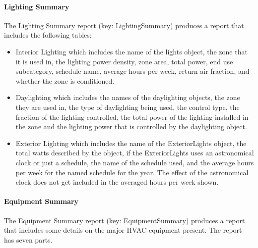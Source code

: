 \paragraph{Lighting Summary}\label{lighting-summary}

The Lighting Summary report (key: LightingSummary) produces a report that includes the following tables:

\begin{itemize}
\item
  Interior Lighting which includes the name of the lights object, the zone that it is used in, the lighting power density, zone area, total power, end use subcategory, schedule name, average hours per week, return air fraction, and whether the zone is conditioned.
\item
  Daylighting which includes the names of the daylighting objects, the zone they are used in, the type of daylighting being used, the control type, the fraction of the lighting controlled, the total power of the lighting installed in the zone and the lighting power that is controlled by the daylighting object.
\item
  Exterior Lighting which includes the name of the ExteriorLights object, the total watts described by the object, if the ExteriorLights uses an astronomical clock or just a schedule, the name of the schedule used, and the average hours per week for the named schedule for the year. The effect of the astronomical clock does not get included in the averaged hours per week shown.
\end{itemize}

\paragraph{Equipment Summary}\label{equipment-summary}

The Equipment Summary report (key: EquipmentSummary) produces a report that includes some details on the major HVAC equipment present. The report has seven parts.

